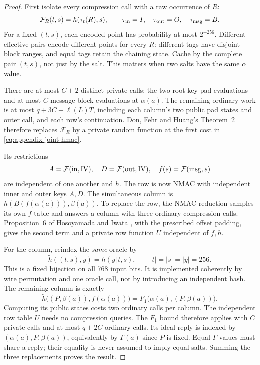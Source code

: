 \begin{proof}
First isolate every compression call with a raw occurrence of $R$:
\[
 \mathcal F_R(t,s)=h(\tau_t(R),s),
 \qquad \tau_{\rm in}=I,\quad\tau_{\rm out}=O,\quad\tau_{\rm msg}=B.
\]
For a fixed $(t,s)$, each encoded point has probability at most $2^{-256}$.
Different effective pairs encode different points for every $R$:
different tags have disjoint block ranges, and equal tags retain the
chaining state. Cache by the complete pair $(t,s)$, not just by the salt.
This matters when two salts have the same $\alpha$ value.

There are at most $C+2$ distinct private calls: the two root key-pad
evaluations and at most $C$ message-block evaluations at $\alpha(a)$.
The remaining ordinary work is at most $q+3C+\ell(L)T$, including each
column's two public pad states and outer call, and each row's continuation.
Don, Fehr and Huang's Theorem~2~\cite{dfh2022} therefore replaces
$\mathcal F_R$ by a private random function at the first cost in
\eqref{eq:appendix-joint-hmac}.

Its restrictions
\[
 A=\mathcal F({\rm in},\mathrm{IV}),\quad
 D=\mathcal F({\rm out},\mathrm{IV}),\quad
 f(s)=\mathcal F({\rm msg},s)
\]
are independent of one another and $h$. The row is now NMAC with independent
inner and outer keys $A,D$. The simultaneous column is
$h(B(f(\alpha(a))),\beta(a))$. To replace the row, the NMAC reduction
samples its own $f$ table and answers a column with three ordinary
compression calls. Proposition~6 of Hosoyamada and Iwata
\cite{hmacqrom2021}, with the prescribed offset padding, gives the second
term and a private row function $U$ independent of $f,h$.

For the column, reindex the \emph{same} oracle by
\[
 \widetilde h((t,s),y)=h(y\Vert t,s),
 \qquad |t|=|s|=|y|=256.
\]
This is a fixed bijection on all 768 input bits. It is implemented
coherently by wire permutation and one oracle call, not by introducing an
independent hash. The remaining column is exactly
\[
 \widetilde h\bigl((P,\beta(a)),f(\alpha(a))\bigr)
   =F_1\bigl(\alpha(a),(P,\beta(a))\bigr).
\]
Computing its public states costs two ordinary calls per column. The
independent row table $U$ needs no compression queries.
The $F_1$ bound therefore applies with $C$ private calls and at most
$q+2C$ ordinary calls. Its ideal reply is indexed by
$(\alpha(a),P,\beta(a))$, equivalently by $\Gamma(a)$ since $P$ is fixed.
Equal $\Gamma$ values must share a reply; their equality is never assumed
to imply equal salts. Summing the three replacements proves the result.
\end{proof}

